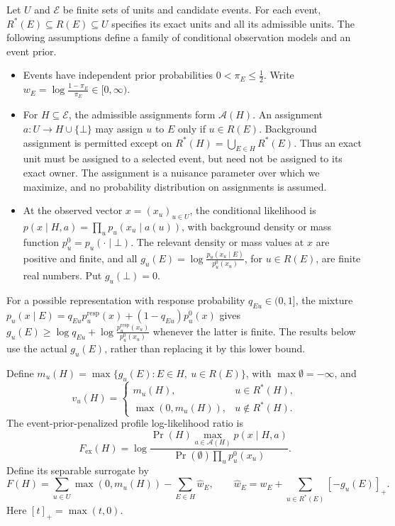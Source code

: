 \documentclass[10pt]{article}
\newcommand{\E}{\mathcal{E}}
\theoremstyle{plain}
\theoremstyle{remark}
\begin{document}
Let $U$ and $\E$ be finite sets of units and candidate events. For each event, $R^*(E)\subseteq R(E)\subseteq U$ specifies its exact units and all its admissible units. The following assumptions define a family of conditional observation models and an event prior.
\begin{itemize}
\item[(M1)] Events have independent prior probabilities $0<\pi_E\le\tfrac12$. Write $w_E=\log\tfrac{1-\pi_E}{\pi_E}\in[0,\infty)$.
\item[(M2)] For $H\subseteq\E$, the admissible assignments form $\mathcal A(H)$. An assignment $a:U\to H\cup\{\bot\}$ may assign $u$ to $E$ only if $u\in R(E)$. Background assignment is permitted except on $R^*(H)=\bigcup_{E\in H}R^*(E)$. Thus an exact unit must be assigned to a selected event, but need not be assigned to its exact owner. The assignment is a nuisance parameter over which we maximize, and no probability distribution on assignments is assumed.
\item[(M3)] At the observed vector $x=(x_u)_{u\in U}$, the conditional likelihood is $p(x\mid H,a)=\prod_u p_u(x_u\mid a(u))$, with background density or mass function $p_u^0=p_u(\cdot\mid\bot)$. The relevant density or mass values at $x$ are positive and finite, and all $g_u(E)=\log\tfrac{p_u(x_u\mid E)}{p_u^0(x_u)}$, for $u\in R(E)$, are finite real numbers. Put $g_u(\bot)=0$.
\end{itemize}
For a possible representation with response probability $q_{Eu}\in(0,1]$, the mixture $p_u(x\mid E)=q_{Eu}p_u^{\mathrm{resp}}(x)+(1-q_{Eu})p_u^0(x)$ gives
$g_u(E)\ge\log q_{Eu}+\log\tfrac{p_u^{\mathrm{resp}}(x_u)}{p_u^0(x_u)}$ whenever the latter is finite. The results below use the actual $g_u(E)$, rather than replacing it by this lower bound.

Define $m_u(H)=\max\{g_u(E):E\in H,\ u\in R(E)\}$, with $\max\emptyset=-\infty$, and
\[
v_u(H)=\begin{cases}
m_u(H),&u\in R^*(H),\\
\max(0,m_u(H)),&u\notin R^*(H).
\end{cases}
\]
The event-prior-penalized profile log-likelihood ratio is
\[
F_{\mathrm{ex}}(H)=\log\frac{\Pr(H)\max_{a\in\mathcal A(H)}p(x\mid H,a)}{\Pr(\emptyset)\prod_u p_u^0(x_u)}.
\]
Define its separable surrogate by
\[
F(H)=\sum_{u\in U}\max(0,m_u(H))-\sum_{E\in H}\hat w_E,
\qquad
\hat w_E=w_E+\sum_{u\in R^*(E)}[-g_u(E)]_+.
\]
Here $[t]_+=\max(t,0)$.
\end{document}
